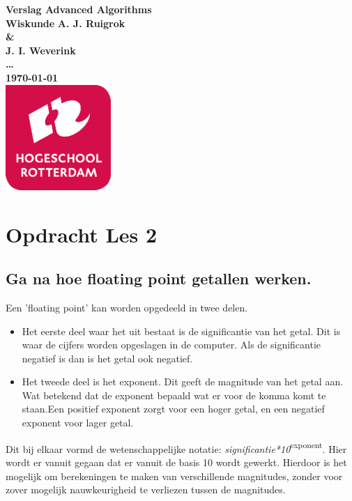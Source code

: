 \documentclass{article}%
\begin{document}
\sffamily
\begin{titlepage}
  \centering
    \vfill
    {\bfseries\Huge
      Verslag Advanced Algorithms\\{\huge Wiskunde}
        \vskip2cm
      }
      {\bfseries\Large
        A. J. Ruigrok\\\&\\J. I. Weverink\\
      }
      {
        \bfseries\normalsize
        \ldots\\
        \vskip1cm
        \today\\
    }    
    \vfill
    \includegraphics[width=4cm]{pictures/logohr.png} %
    \vfill
    \vfill
\end{titlepage}
\newpage
\tableofcontents

\newpage
 

\clearpage

\setcounter{section}{1}
\section{Opdracht Les 2}

\subsection{\normalsize{Ga na hoe floating point getallen werken.}}
Een 'floating point' kan worden opgedeeld in twee delen.
\begin{itemize}
\item Het eerste deel waar het uit bestaat is de significantie van het getal. Dit is waar de cijfers worden opgeslagen in de computer. Als de significantie negatief is dan is het getal ook negatief.

\item Het tweede deel is het exponent. Dit geeft de magnitude van het getal aan. Wat betekend dat de exponent bepaald wat er voor de komma komt te staan.Een positief exponent zorgt voor een hoger getal, en een negatief exponent voor lager getal.
\end{itemize}
Dit bij elkaar vormd de wetenschappelijke notatie: \small{\textit{significantie*10}\normalsize{\textsuperscript{exponent}}}. Hier wordt er vanuit gegaan dat er vanuit de basis 10 wordt gewerkt. Hierdoor is het mogelijk om berekeningen te maken van verschillende magnitudes, zonder voor zover mogelijk nauwkeurigheid te verliezen tussen de magnitudes.
\end{document}
